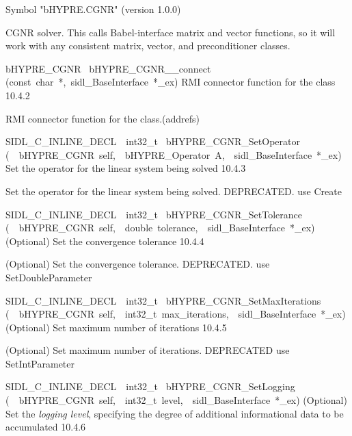 \documentclass{article}
\begin{document}
\begin{cxxentry}
\begin{cxxentry}
\begin{cxxvariable}
\begin{cxxdoc}
Symbol "bHYPRE.CGNR" (version 1.0.0)

CGNR solver.
This calls Babel-interface matrix and vector functions, so it will work
with any consistent matrix, vector, and preconditioner classes.
\end{cxxdoc}
\end{cxxvariable}
\begin{cxxfunction}
{bHYPRE\_CGNR\ }
        {bHYPRE\_CGNR\_\_connect}
        {(const\ char\ *,\ sidl\_BaseInterface\ *\_ex)}
        {
RMI connector function for the class}
        {10.4.2}
\begin{cxxdoc}

RMI connector function for the class.(addrefs)
\end{cxxdoc}
\end{cxxfunction}
\begin{cxxfunction}
{SIDL\_C\_INLINE\_DECL\ \ int32\_t\ }
        {bHYPRE\_CGNR\_SetOperator}
        {(\ \ bHYPRE\_CGNR\ self,\ \ bHYPRE\_Operator\ A,\ \ sidl\_BaseInterface\ *\_ex)}
        {
Set the operator for the linear system being solved}
        {10.4.3}
\begin{cxxdoc}

Set the operator for the linear system being solved.
DEPRECATED.  use Create
\end{cxxdoc}
\end{cxxfunction}
\begin{cxxfunction}
{SIDL\_C\_INLINE\_DECL\ \ int32\_t\ }
        {bHYPRE\_CGNR\_SetTolerance}
        {(\ \ bHYPRE\_CGNR\ self,\ \ double\ tolerance,\ \ sidl\_BaseInterface\ *\_ex)}
        {
(Optional) Set the convergence tolerance}
        {10.4.4}
\begin{cxxdoc}

(Optional) Set the convergence tolerance.
DEPRECATED.  use SetDoubleParameter
\end{cxxdoc}
\end{cxxfunction}
\begin{cxxfunction}
{SIDL\_C\_INLINE\_DECL\ \ int32\_t\ }
        {bHYPRE\_CGNR\_SetMaxIterations}
        {(\ \ bHYPRE\_CGNR\ self,\ \ int32\_t\ max\_iterations,\ \ sidl\_BaseInterface\ *\_ex)}
        {
(Optional) Set maximum number of iterations}
        {10.4.5}
\begin{cxxdoc}

(Optional) Set maximum number of iterations.
DEPRECATED   use SetIntParameter
\end{cxxdoc}
\end{cxxfunction}
\begin{cxxfunction}
{SIDL\_C\_INLINE\_DECL\ \ int32\_t\ }
        {bHYPRE\_CGNR\_SetLogging}
        {(\ \ bHYPRE\_CGNR\ self,\ \ int32\_t\ level,\ \ sidl\_BaseInterface\ *\_ex)}
        {
(Optional) Set the {\it logging level}, specifying the degree
of additional informational data to be accumulated}
        {10.4.6}
\begin{cxxdoc}


\end{cxxdoc}
\end{cxxfunction}
\end{cxxentry}
\end{cxxentry}
\end{document}
